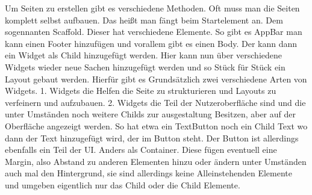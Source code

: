 Um Seiten zu erstellen gibt es verschiedene Methoden. Oft muss man die Seiten komplett selbst aufbauen. Das heißt man fängt beim Startelement an. Dem sogennanten Scaffold. Dieser hat verschiedene Elemente. So gibt es AppBar man kann einen Footer hinzufügen und vorallem gibt es einen Body. Der kann dann ein Widget als Child hinzugefügt werden. Hier kann nun über verschiedene Widgets wieder neue Sachen hinzugefügt werden und so Stück für Stück ein Layout gebaut werden. 
Hierfür gibt es Grundsätzlich zwei verschiedene Arten von Widgets. 
1. Widgets die Helfen die Seite zu strukturieren und Layouts zu verfeinern und aufzubauen.
2. Widgets die Teil der Nutzeroberfläche sind und die unter Umständen noch weitere Childs zur ausgestaltung Besitzen, aber auf der Oberfläche angezeigt werden. So hat etwa ein TextButton noch ein Child Text wo dann der Text hinzugefügt wird, der im Button steht. Der Button ist allerdings ebenfalls ein Teil der UI. Anders als Container. Diese fügen eventuell eine Margin, also Abstand zu anderen Elementen hinzu oder ändern unter Umständen auch mal den Hintergrund, sie sind allerdings keine Alleinstehenden Elemente und umgeben eigentlich nur das Child oder die Child Elemente.